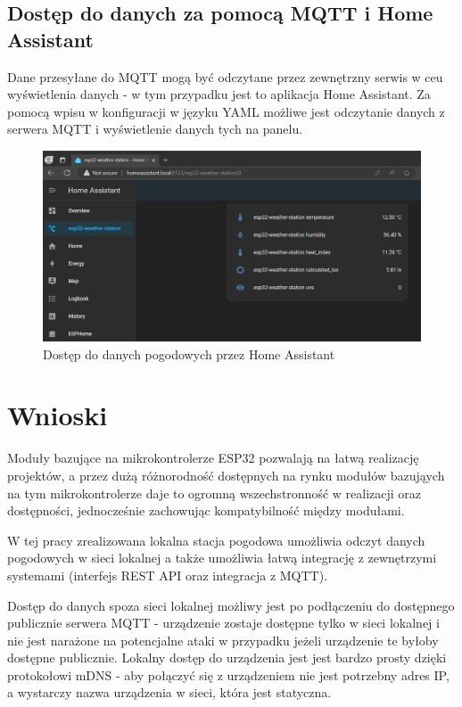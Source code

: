 \documentclass[12pt,a4paper]{article}
\begin{document}
\subsection{Dostęp do danych za pomocą MQTT i Home Assistant}

Dane przesyłane do MQTT mogą być odczytane przez zewnętrzny serwis w ceu wyświetlenia danych - w tym przypadku jest to aplikacja Home Assistant\cite{homeassistant}. Za pomocą wpisu w konfiguracji w języku
YAML możliwe jest odczytanie danych z serwera MQTT i wyświetlenie danych tych na panelu. 

\begin{figure}[H]
    \centering
    \includegraphics[width=\textwidth]{home-assistant-weathe-station.png}
    \caption{Dostęp do danych pogodowych przez Home Assistant}
    \label{homeassistant-weather-station}
\end{figure}

\section{Wnioski}
Moduły bazujące na mikrokontrolerze ESP32 pozwalają na łatwą realizację projektów, a przez dużą różnorodność
dostępnych na rynku modułów bazująych na tym mikrokontrolerze daje to ogromną wszechstronność w realizacji oraz dostępności, jednocześnie zachowując kompatybilność między modułami.

W tej pracy zrealizowana lokalna stacja pogodowa umożliwia odczyt danych pogodowych w sieci lokalnej a także umożliwia łatwą integrację z zewnętrzymi systemami (interfejs REST API oraz integracja z MQTT).

Dostęp do danych spoza sieci lokalnej możliwy jest po podłączeniu do dostępnego publicznie serwera MQTT - urządzenie zostaje dostępne tylko w sieci lokalnej i nie jest narażone na potencjalne ataki w przypadku jeżeli urządzenie te byłoby dostępne publicznie. Lokalny dostęp do urządzenia jest jest bardzo prosty dzięki protokołowi mDNS - aby połączyć się z urządzeniem nie jest potrzebny adres IP, a wystarczy nazwa urządzenia w sieci, która jest statyczna.
\end{document}

